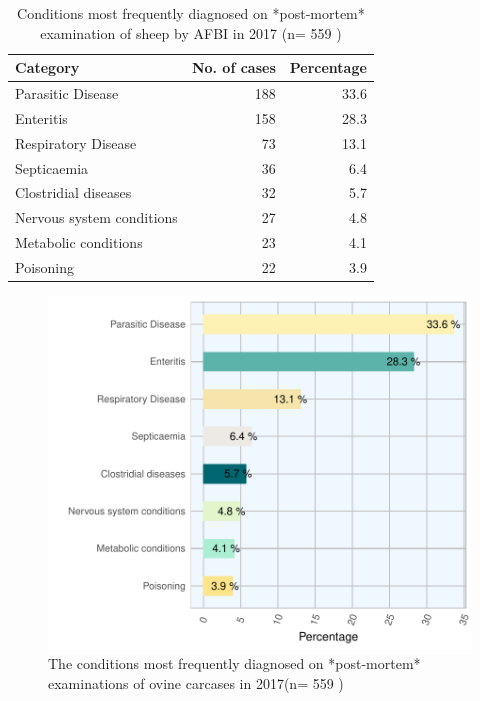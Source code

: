 \documentclass[]{book}
\begin{document}
\begin{table}

\caption{\label{tab:unnamed-chunk-78}Conditions most frequently diagnosed on *post-mortem* examination of sheep by AFBI in 2017 (n= 559 )}
\centering
\begin{tabular}[t]{l|r|r}
\hline
Category & No. of cases & Percentage\\
\hline
Parasitic Disease & 188 & 33.6\\
\hline
Enteritis & 158 & 28.3\\
\hline
Respiratory Disease & 73 & 13.1\\
\hline
Septicaemia & 36 & 6.4\\
\hline
Clostridial diseases & 32 & 5.7\\
\hline
Nervous system conditions & 27 & 4.8\\
\hline
Metabolic conditions & 23 & 4.1\\
\hline
Poisoning & 22 & 3.9\\
\hline
\end{tabular}
\end{table}

\begin{figure}

{\centering \includegraphics{AFBI_files/figure-latex/unnamed-chunk-79-1} 

}

\caption{The conditions most frequently diagnosed on *post-mortem* examinations of  ovine carcases in 2017(n= 559 )}\label{fig:unnamed-chunk-79}
\end{figure}
\end{document}
